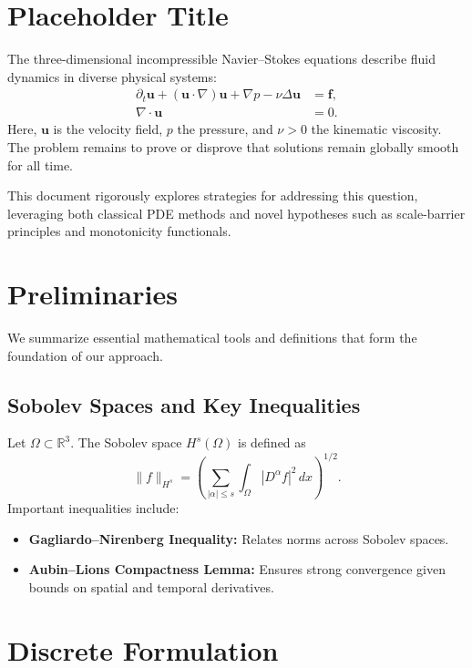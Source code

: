 \section{Placeholder Title}
The three-dimensional incompressible Navier--Stokes equations describe fluid dynamics in diverse physical systems:
\begin{align}
    \partial_t \mathbf{u} + (\mathbf{u} \cdot \nabla) \mathbf{u} + \nabla p - \nu \Delta \mathbf{u} &= \mathbf{f}, \label{eq:momentum} \\
    \nabla \cdot \mathbf{u} &= 0. \label{eq:incompressibility}
\end{align}
Here, $\mathbf{u}$ is the velocity field, $p$ the pressure, and $\nu > 0$ the kinematic viscosity. The problem remains to prove or disprove that solutions remain globally smooth for all time.

This document rigorously explores strategies for addressing this question, leveraging both classical PDE methods and novel hypotheses such as scale-barrier principles and monotonicity functionals.

\section{Preliminaries}
We summarize essential mathematical tools and definitions that form the foundation of our approach.

\subsection{Sobolev Spaces and Key Inequalities}
Let $\Omega \subset \mathbb{R}^3$. The Sobolev space $H^s(\Omega)$ is defined as
\begin{equation}
    \|f\|_{H^s} = \left(\sum_{|\alpha| \leq s} \int_{\Omega} |D^\alpha f|^2 \, dx \right)^{1/2}.
\end{equation}
Important inequalities include:
\begin{itemize}
    \item \textbf{Gagliardo--Nirenberg Inequality:} Relates norms across Sobolev spaces.
    \item \textbf{Aubin--Lions Compactness Lemma:} Ensures strong convergence given bounds on spatial and temporal derivatives.
\end{itemize}

\section{Discrete Formulation}
